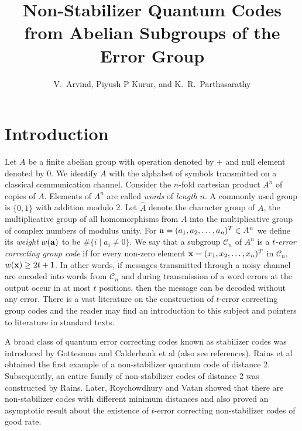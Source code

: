 \documentclass{Rinton-P9x6}
\title{{\bf Non-Stabilizer Quantum Codes from Abelian Subgroups of the
    Error Group}}
\author{
V.~Arvind, Piyush P Kurur, and K.~R.~Parthasarathy
}
\renewcommand{\bold}[1]{{\bf #1}}
\renewcommand{\a}{{\bf a}}
\newcommand{\C}{{\ensuremath{\mathcal{C}}}}
\begin{document}
\maketitle


\section{Introduction}

Let $A$ be a finite abelian group with operation denoted by $+$ and
null element denoted by 0. We identify $A$ with the alphabet of
symbols transmitted on a classical communication channel. Consider the
$n$-fold cartesian product $A^n$ of copies of $A$. Elements of $A^n$
are called \emph{words} of \emph{length} $n$. A commonly used group is
$\{0,1\}$ with addition modulo 2.  Let $\hat{A}$ denote the character
group of $A$, the multiplicative group of all homomorphisms {from} $A$
into the multiplicative group of complex numbers of modulus unity. For
$\a=(a_1,a_2,\ldots,a_n)^T\in A^n$ we define its \emph{weight} $w(\bold{a})$
to be $\#\{i\mid a_i\neq 0\}$.  We say that a subgroup $\C_n$ of $A^n$
is a \emph{$t$-error correcting group code} if for every non-zero
element $\bold{x}=(x_1,x_2,\ldots,x_n)^T$ in $\C_n$, $w(\bold{x})\geq
2t+1$.  In other words, if messages transmitted through a noisy
channel are encoded into words {from} $\C_n$ and during transmission
of a word errors at the output occur in at most $t$ positions, then
the message can be decoded without any error. There is a vast
literature on the construction of $t$-error correcting group codes and
the reader may find an introduction to this subject and pointers to
literature in standard texts\cite{sloan,vLin}.

A broad class of quantum error correcting codes known as stabilizer
codes was introduced by Gottesman\cite{gottes} and Calderbank et
al\cite{cald-shor} (also see
references\cite{kl2,rains97nonadditive,rains}). Rains et
al\cite{rains97nonadditive} obtained the first example of a
non-stabilizer quantum code of distance 2. Subsequently, an entire
family of non-stabilizer codes of distance 2 was constructed by
Rains\cite{rains97}. Later, Roychowdhury and Vatan\cite{vwani98qcqc}
showed that there are non-stabilizer codes with different minimum
distances and also proved an asymptotic result about the existence of
$t$-error correcting non-stabilizer codes of good rate. 
\end{document}
